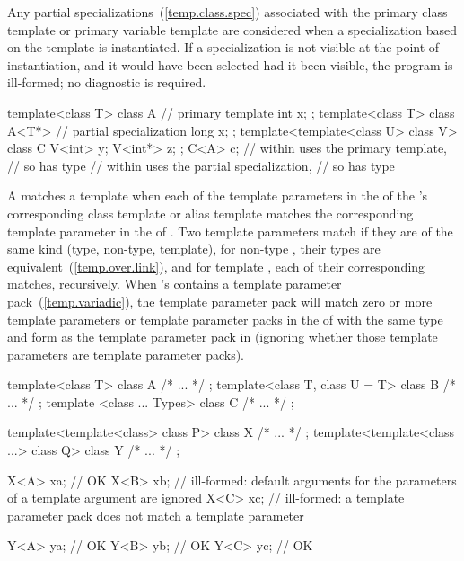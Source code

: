 \pnum
Any partial specializations~(\ref{temp.class.spec}) associated with the
primary class template or primary variable template are considered when a
specialization based on the template
is instantiated.
If a specialization is not visible at the point of instantiation,
and it would have been selected had it been visible, the program is ill-formed;
no diagnostic is required.
\enterexample

\begin{codeblock}
template<class T> class A {     // primary template
  int x;
};
template<class T> class A<T*> { // partial specialization
  long x;
};
template<template<class U> class V> class C {
  V<int>  y;
  V<int*> z;
};
C<A> c;                         //  within  uses the primary template,
                                // so  has type 
                                //  within  uses the partial specialization,
                                // so  has type 
\end{codeblock}
\exitexample

\pnum A  matches a template
  when each of the template
parameters in the  of the
's corresponding class template or alias template
 matches the corresponding template parameter in the
 of . 
Two template parameters match if they are of the same kind (type, non-type, template),
for non-type , their types are
equivalent~(\ref{temp.over.link}), and for template ,
each of their corresponding  matches, recursively.
When 's  contains a template parameter
pack~(\ref{temp.variadic}), the template parameter pack will match zero or more template
parameters or template parameter packs in the  of
 with the same type and form as the template parameter pack in 
(ignoring whether those template parameters are template parameter packs).

\enterexample
\begin{codeblock}
template<class T> class A { /* ... */ };
template<class T, class U = T> class B { /* ... */ };
template <class ... Types> class C { /* ... */ };

template<template<class> class P> class X { /* ... */ };
template<template<class ...> class Q> class Y { /* ... */ };

X<A> xa;            // OK
X<B> xb;            // ill-formed: default arguments for the parameters of a template argument are ignored
X<C> xc;            // ill-formed: a template parameter pack does not match a template parameter

Y<A> ya;            // OK
Y<B> yb;            // OK
Y<C> yc;            // OK
\end{codeblock}
\exitexample

